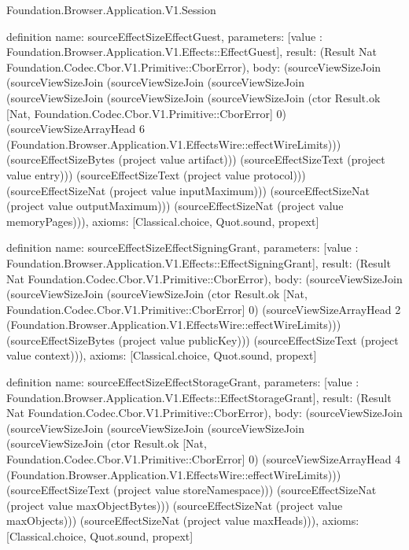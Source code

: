 \begin{lexlean}{Foundation.Browser.Application.V1.Session}
\begin{semanticmodule}
definition{
  name: sourceEffectSizeEffectGuest,
  parameters: [value : Foundation.Browser.Application.V1.Effects::EffectGuest],
  result: (Result Nat Foundation.Codec.Cbor.V1.Primitive::CborError),
  body: (sourceViewSizeJoin (sourceViewSizeJoin (sourceViewSizeJoin (sourceViewSizeJoin (sourceViewSizeJoin (sourceViewSizeJoin (sourceViewSizeJoin (ctor Result.ok [Nat, Foundation.Codec.Cbor.V1.Primitive::CborError] 0) (sourceViewSizeArrayHead 6 (Foundation.Browser.Application.V1.EffectsWire::effectWireLimits))) (sourceEffectSizeBytes (project value artifact))) (sourceEffectSizeText (project value entry))) (sourceEffectSizeText (project value protocol))) (sourceEffectSizeNat (project value inputMaximum))) (sourceEffectSizeNat (project value outputMaximum))) (sourceEffectSizeNat (project value memoryPages))),
  axioms: [Classical.choice, Quot.sound, propext]
}

definition{
  name: sourceEffectSizeEffectSigningGrant,
  parameters: [value : Foundation.Browser.Application.V1.Effects::EffectSigningGrant],
  result: (Result Nat Foundation.Codec.Cbor.V1.Primitive::CborError),
  body: (sourceViewSizeJoin (sourceViewSizeJoin (sourceViewSizeJoin (ctor Result.ok [Nat, Foundation.Codec.Cbor.V1.Primitive::CborError] 0) (sourceViewSizeArrayHead 2 (Foundation.Browser.Application.V1.EffectsWire::effectWireLimits))) (sourceEffectSizeBytes (project value publicKey))) (sourceEffectSizeText (project value context))),
  axioms: [Classical.choice, Quot.sound, propext]
}

definition{
  name: sourceEffectSizeEffectStorageGrant,
  parameters: [value : Foundation.Browser.Application.V1.Effects::EffectStorageGrant],
  result: (Result Nat Foundation.Codec.Cbor.V1.Primitive::CborError),
  body: (sourceViewSizeJoin (sourceViewSizeJoin (sourceViewSizeJoin (sourceViewSizeJoin (sourceViewSizeJoin (ctor Result.ok [Nat, Foundation.Codec.Cbor.V1.Primitive::CborError] 0) (sourceViewSizeArrayHead 4 (Foundation.Browser.Application.V1.EffectsWire::effectWireLimits))) (sourceEffectSizeText (project value storeNamespace))) (sourceEffectSizeNat (project value maxObjectBytes))) (sourceEffectSizeNat (project value maxObjects))) (sourceEffectSizeNat (project value maxHeads))),
  axioms: [Classical.choice, Quot.sound, propext]
}


\end{semanticmodule}
\end{lexlean}
